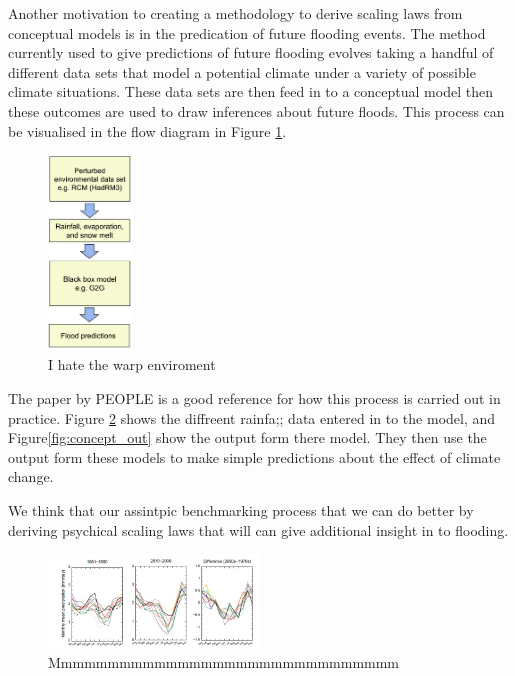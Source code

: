 \documentclass[11pt]{article}
\begin{document}
Another motivation to creating a methodology to derive scaling laws from conceptual models is in the predication of future flooding events. The method currently used to give predictions of future flooding evolves taking a handful of different data sets that model a potential climate under a variety of possible climate situations. These data sets are then feed in to a conceptual model then these outcomes are used to draw inferences about future floods.
This process can be visualised in the flow diagram in Figure \ref{fig:flow}.

\begin{figure}[H]%
    \centering
    \includegraphics[width=0.2\textwidth]{Figs/flow.png}
    \caption{I hate the warp enviroment}
    \label{fig:flow}
\end{figure}

The paper by PEOPLE is a good reference for how this process is carried out in practice. Figure \ref{fig:concept_in} shows the diffreent rainfa;; data entered in to the model, and Figure\ref{fig:concept_out} show the output form there model. They then use the output form these models to make simple predictions about the effect of climate change.

We think that our assintpic benchmarking process that we can do better by deriving psychical scaling laws that will can give additional insight in to flooding.

\begin{figure}[H]%
    \centering
    \includegraphics[width=0.5\textwidth]{Figs/concept_in.jpg}
    \caption{Mmmmmmmmmmmmmmmmmmmmmmmmmmmmmm}
    \label{fig:concept_in}
\end{figure}
\end{document}
